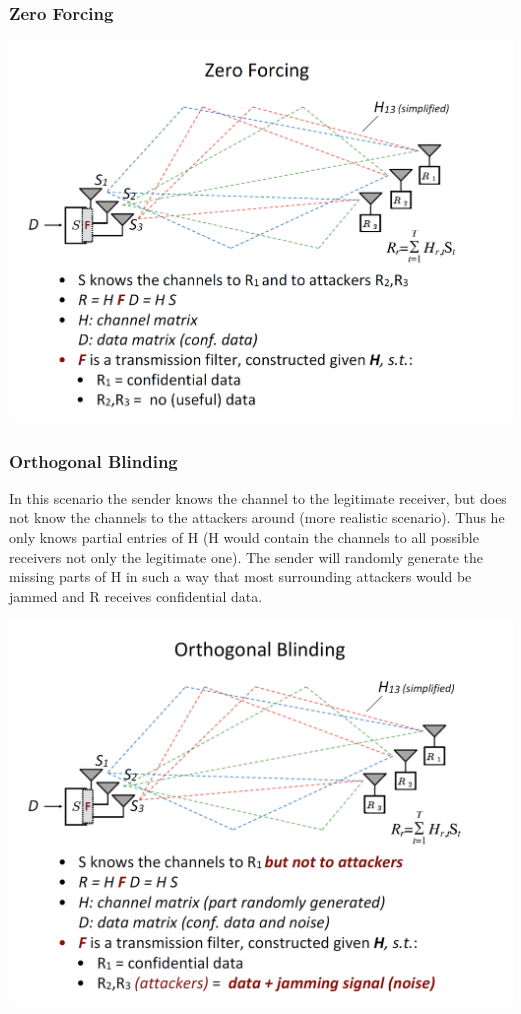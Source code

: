 \subsubsection{Zero Forcing}
\begin{minipage}{\linewidth}
    \centering      
    \includegraphics[width=\linewidth]{Figures/L7_zero_forcing.PNG} 
\end{minipage}

\subsubsection{Orthogonal Blinding}
In this scenario the sender knows the channel to the legitimate receiver, but does not know the channels to the attackers around (more realistic scenario). Thus he only knows partial entries of H (H would contain the channels to all possible receivers not only the legitimate one). The sender will randomly generate the missing parts of H in such a way that most surrounding attackers would be jammed and R receives confidential data.
\begin{minipage}{\linewidth}
    \centering      
    \includegraphics[width=\linewidth]{Figures/L7_orthogonal_blinding.PNG} 
\end{minipage}

